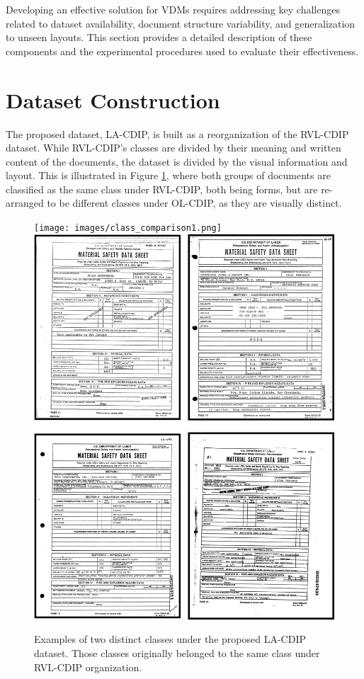 Developing an effective solution for \glspl{VDM} requires addressing key challenges related to dataset availability, document structure variability, and generalization to unseen layouts. This section provides a detailed description of these components and the experimental procedures used to evaluate their effectiveness. 


\section{Dataset Construction}
\label{sec:method_dataset}

The proposed dataset, \gls{LA-CDIP}, is built as a reorganization of the RVL-CDIP \cite{harley2015rvlcdip} dataset. While RVL-CDIP's classes are divided by their meaning and written content of the documents, the dataset is divided by the visual information and layout. This is illustrated in Figure \ref{img:dataset}, where both groups of documents are classified as the same class under RVL-CDIP, both being forms, but are re-arranged to be different classes under OL-CDIP, as they are visually distinct. 

\begin{figure}[htbp]
  \centering
\texttt{[image: images/class\_comparison1.png]} \hspace{.04\textwidth}
    \includegraphics[width=.455\textwidth]{images/class_comparison2.png}

\caption{Examples of two distinct classes under the proposed \gls{LA-CDIP} dataset. Those classes originally belonged to the same class under RVL-CDIP organization.\label{img:dataset}}
\end{figure}   

